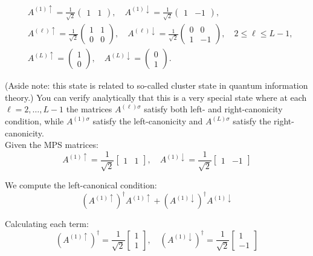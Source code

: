 \documentclass[12pt]{article}
\begin{document}
\begin{align*}
& A^{(1) \uparrow}=\frac{1}{\sqrt{2}}\left(\begin{array}{ll}
1 & 1
\end{array}\right), \quad A^{(1) \downarrow}=\frac{1}{\sqrt{2}}\left(\begin{array}{ll}
1 & -1
\end{array}\right),  \tag{27}\\
& A^{(\ell) \uparrow}=\frac{1}{\sqrt{2}}\left(\begin{array}{ll}
1 & 1 \\
0 & 0
\end{array}\right), \quad A^{(\ell) \downarrow}=\frac{1}{\sqrt{2}}\left(\begin{array}{cc}
0 & 0 \\
1 & -1
\end{array}\right), \quad 2 \leq \ell \leq L-1,  \tag{28}\\
& A^{(L) \uparrow}=\left(\begin{array}{l}
1 \\
0
\end{array}\right), \quad A^{(L) \downarrow}=\left(\begin{array}{l}
0 \\
1
\end{array}\right) . \tag{29}
\end{align*}


(Aside note: this state is related to so-called cluster state in quantum information theory.) You can verify analytically that this is a very special state where at each $\ell=2, \ldots, L-1$ the matrices $A^{(\ell) \sigma}$ satisfy both left- and right-canonicity condition, while $A^{(1) \sigma}$ satisfy the left-canonicity and $A^{(L) \sigma}$ satisfy the right-canonicity. \\
Given the MPS matrices:
\[
A^{(1) \uparrow} = \frac{1}{\sqrt{2}}
\begin{bmatrix}
1 & 1
\end{bmatrix}, \quad
A^{(1) \downarrow} = \frac{1}{\sqrt{2}}
\begin{bmatrix}
1 & -1
\end{bmatrix}
\]

We compute the left-canonical condition:
\[
\left(A^{(1) \uparrow}\right)^\dagger A^{(1) \uparrow} + \left(A^{(1) \downarrow}\right)^\dagger A^{(1) \downarrow}
\]

Calculating each term:
\[
\left(A^{(1) \uparrow}\right)^\dagger = \frac{1}{\sqrt{2}}
\begin{bmatrix}
1 \\
1
\end{bmatrix}, \quad
\left(A^{(1) \downarrow}\right)^\dagger = \frac{1}{\sqrt{2}}
\begin{bmatrix}
1 \\
-1
\end{bmatrix}
\]
\end{document}
